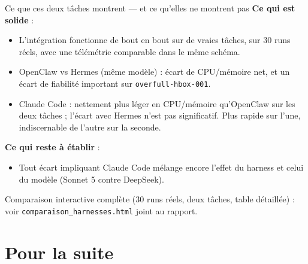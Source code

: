 \documentclass[aspectratio=169]{beamer}
\begin{document}
\begin{frame}{Ce que ces deux tâches montrent --- et ce qu'elles ne montrent pas}
\textbf{Ce qui est solide} :
\begin{itemize}
  \item L'intégration fonctionne de bout en bout sur de vraies tâches, sur
        30 runs réels, avec une télémétrie comparable dans le même schéma.
  \item OpenClaw vs Hermes (même modèle) : écart de CPU/mémoire net, et un
        écart de fiabilité important sur \texttt{overfull-hbox-001}.
  \item Claude Code : nettement plus léger en CPU/mémoire qu'OpenClaw sur les deux
        tâches ; l'écart avec Hermes n'est pas significatif. Plus rapide sur l'une,
        indiscernable de l'autre sur la seconde.
\end{itemize}

\vspace{0.3cm}
\textbf{Ce qui reste à établir} :
\begin{itemize}
  \item Tout écart impliquant Claude Code mélange encore l'effet du harness
        et celui du modèle (Sonnet 5 contre DeepSeek).
\end{itemize}

\vspace{0.3cm}
Comparaison interactive complète (30 runs réels, deux tâches, table
détaillée) : voir \texttt{comparaison\_harnesses.html} joint au rapport.
\end{frame}

\section{Pour la suite}
\end{document}
